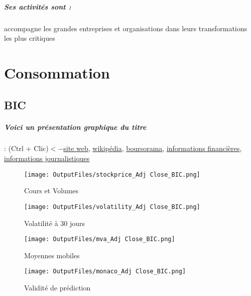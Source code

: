 \documentclass[11pt,a4paper]{report}%
\begin{document}
\paragraph{Ses activités sont : } accompagne les grandes entreprises et organisations dans leurs transformations les plus critiques 
    
    \newpage\chapter{Consommation}


\section{BIC}

\paragraph{Voici un présentation graphique du titre} : (Ctrl + Clic)$<-$\href{https://fr.bicworld.com/investisseurs}{site web}, \href{https://fr.wikipedia.org/wiki/Bic_(entreprise)}{wikipédia}, \href{https://www.boursorama.com/cours/1rPBB}{boursorama}, \href{https://www.qwant.com/?q=site:https:%2f%2fwww.easybourse.com%2faction-societe%2fBIC&t=web&client=ext-firefox-hp}{informations financières}, \href{https://bourse.lerevenu.com/cours-de-bourse/fiche-valeur-synthese/BIC/BB-FR}{informations journalistiques}
\begin{figure}[!htb]
   \begin{minipage}{0.5\textwidth}
     \centering
     \texttt{[image: OutputFiles/stockprice\_Adj Close\_BIC.png]}
     \caption{Cours et Volumes}\label{Fig:price_BIC}
   \end{minipage}\hfill
   \begin{minipage}{0.5\textwidth}
     \centering
     \texttt{[image: OutputFiles/volatility\_Adj Close\_BIC.png]}
     \caption{Volatilité à 30 jours}\label{Fig:volat_BIC}
   \end{minipage}
\end{figure}
\begin{figure}[!htb]
   \begin{minipage}{0.5\textwidth}
     \centering
     \texttt{[image: OutputFiles/mva\_Adj Close\_BIC.png]}
     \caption{Moyennes mobiles}\label{Fig:mva_BIC}
   \end{minipage}\hfill
   \begin{minipage}{0.5\textwidth}
     \centering
     \texttt{[image: OutputFiles/monaco\_Adj Close\_BIC.png]}
     \caption{Validité de prédiction}\label{Fig:prediction_BIC}
   \end{minipage}
\end{figure}
\end{document}
